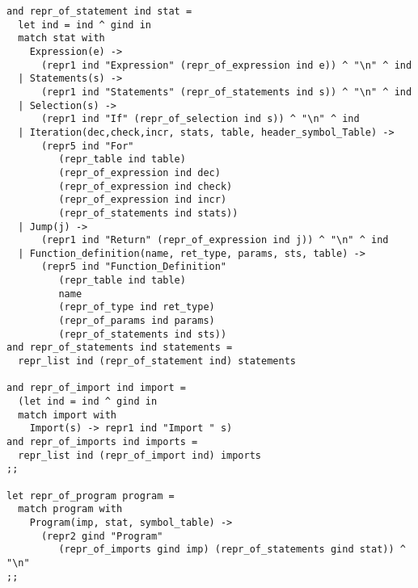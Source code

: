 \begin{verbatim}
and repr_of_statement ind stat =
  let ind = ind ^ gind in
  match stat with
    Expression(e) ->
      (repr1 ind "Expression" (repr_of_expression ind e)) ^ "\n" ^ ind
  | Statements(s) ->
      (repr1 ind "Statements" (repr_of_statements ind s)) ^ "\n" ^ ind
  | Selection(s) ->
      (repr1 ind "If" (repr_of_selection ind s)) ^ "\n" ^ ind
  | Iteration(dec,check,incr, stats, table, header_symbol_Table) ->
      (repr5 ind "For"
         (repr_table ind table)
         (repr_of_expression ind dec)
         (repr_of_expression ind check)
         (repr_of_expression ind incr)
         (repr_of_statements ind stats))
  | Jump(j) ->
      (repr1 ind "Return" (repr_of_expression ind j)) ^ "\n" ^ ind
  | Function_definition(name, ret_type, params, sts, table) ->
      (repr5 ind "Function_Definition"
         (repr_table ind table)
         name
         (repr_of_type ind ret_type)
         (repr_of_params ind params)
         (repr_of_statements ind sts))
and repr_of_statements ind statements =
  repr_list ind (repr_of_statement ind) statements

and repr_of_import ind import =
  (let ind = ind ^ gind in
  match import with
    Import(s) -> repr1 ind "Import " s)
and repr_of_imports ind imports =
  repr_list ind (repr_of_import ind) imports
;;

let repr_of_program program =
  match program with
    Program(imp, stat, symbol_table) ->
      (repr2 gind "Program"
         (repr_of_imports gind imp) (repr_of_statements gind stat)) ^ "\n"
;;
\end{verbatim}